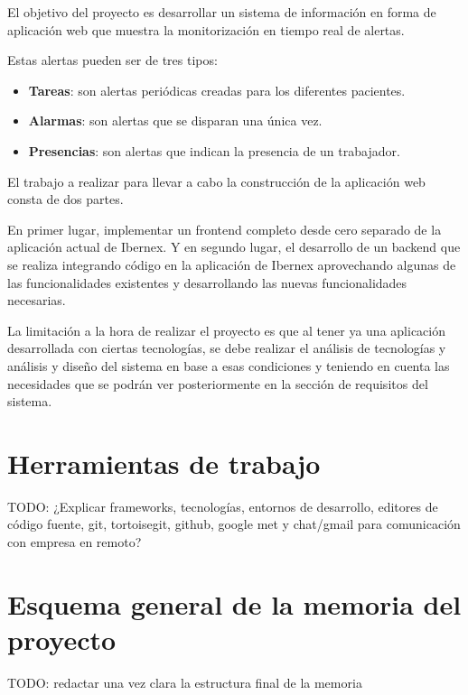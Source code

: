 El objetivo del proyecto es desarrollar un sistema de información en forma de aplicación web que muestra la monitorización en tiempo real de alertas. \newline

Estas alertas pueden ser de tres tipos:
\begin{itemize}
    \item \textbf{Tareas}: son alertas periódicas creadas para los diferentes pacientes.
    \item \textbf{Alarmas}: son alertas que se disparan una única vez.
    \item \textbf{Presencias}: son alertas que indican la presencia de un trabajador.
\end{itemize}

El trabajo a realizar para llevar a cabo la construcción de la aplicación web consta de dos partes.

En primer lugar, implementar un frontend completo desde cero separado de la aplicación actual de Ibernex. Y en segundo lugar, el desarrollo de un backend que se realiza integrando código en la aplicación de Ibernex aprovechando algunas de las funcionalidades existentes y desarrollando las nuevas funcionalidades necesarias. \newline

La limitación a la hora de realizar el proyecto es que al tener ya una aplicación desarrollada con ciertas tecnologías, se debe realizar el análisis de tecnologías y análisis y diseño del sistema en base a esas condiciones y teniendo en cuenta las necesidades que se podrán ver posteriormente en la sección de requisitos del sistema. 


\section{Herramientas de trabajo}


TODO: ¿Explicar frameworks, tecnologías, entornos de desarrollo, editores de código fuente, git, tortoisegit, github, google met y chat/gmail para comunicación con empresa en remoto?

\section{Esquema general de la memoria del proyecto}


TODO: redactar una vez clara la estructura final de la memoria








